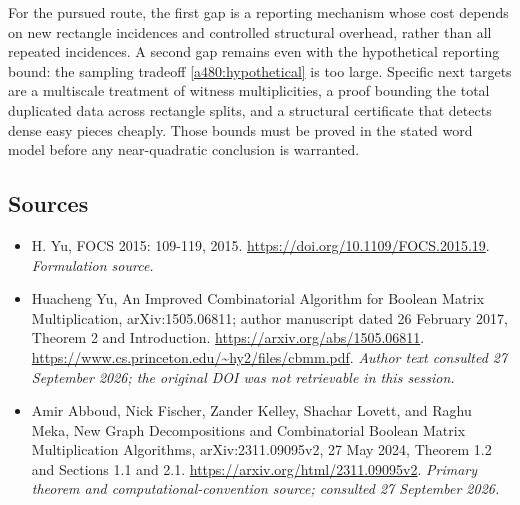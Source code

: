 \documentclass[11pt]{article}
\begin{document}
For the pursued route, the first gap is a reporting mechanism whose cost
depends on new rectangle incidences and controlled structural overhead,
rather than all repeated incidences. A second gap remains even with the
hypothetical reporting bound: the sampling tradeoff
\eqref{a480:hypothetical} is too large. Specific next targets are a
multiscale treatment of witness multiplicities, a proof bounding the
total duplicated data across rectangle splits, and a structural certificate
that detects dense easy pieces cheaply. Those bounds must be proved in
the stated word model before any near-quadratic conclusion is warranted.

\subsection{Sources}
\begin{itemize}
\item[S1]H. Yu, FOCS 2015: 109-119, 2015.
\url{https://doi.org/10.1109/FOCS.2015.19}.
\textit{Formulation source.}
\item[E1]Huacheng Yu, An Improved Combinatorial Algorithm for Boolean
Matrix Multiplication, arXiv:1505.06811; author manuscript dated
26 February 2017, Theorem 2 and Introduction.
\url{https://arxiv.org/abs/1505.06811}.
\url{https://www.cs.princeton.edu/~hy2/files/cbmm.pdf}.
\textit{Author text consulted 27 September 2026; the original DOI was not
retrievable in this session.}
\item[E2]Amir Abboud, Nick Fischer, Zander Kelley, Shachar Lovett, and
Raghu Meka, New Graph Decompositions and Combinatorial Boolean Matrix
Multiplication Algorithms, arXiv:2311.09095v2, 27 May 2024,
Theorem 1.2 and Sections 1.1 and 2.1.
\url{https://arxiv.org/html/2311.09095v2}.
\textit{Primary theorem and computational-convention source; consulted
27 September 2026.}

\end{itemize}
\end{document}
